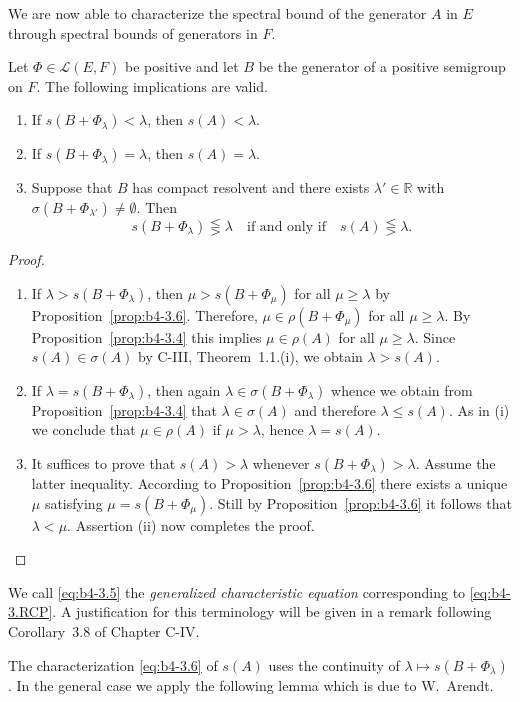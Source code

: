 We are now able to characterize the spectral bound of the generator $A$ in $E$ through spectral bounds of generators in $F$.
\begin{theorem}\label{thm:b4-3.7}
	Let $\Phi \in \mathcal{L}(E,F)$ be positive and let $B$ be the generator of a positive semigroup on $F$. 
	The following implications are valid.
	\begin{enumerate}[\upshape (i)]
		\item If $s(B + \Phi_{\lambda}) < \lambda$, then $s(A) < \lambda$.
        
		\item If $s(B + \Phi_{\lambda}) = \lambda$, then $s(A) = \lambda$.
        
		\item Suppose that $B$ has compact resolvent and there exists $\lambda' \in \mathbb{R}$ with $\sigma(B + \Phi_{\lambda'}) \neq \emptyset$. 
		Then
		\begin{equation}\label{eq:b4-3.6}
		s(B + \Phi_{\lambda}) \lesseqgtr \lambda \quad \text{if and only if} \quad s(A) \lesseqgtr \lambda.
		\end{equation}
	\end{enumerate}
\end{theorem}
\begin{proof}
	\begin{enumerate}[\upshape (i), wide, labelindent=.5em]
	\item 
	If $\lambda > s(B + \Phi_{\lambda})$, then $\mu > s(B + \Phi_{\mu})$ for all $\mu \geq \lambda$ by Proposition~\ref{prop:b4-3.6}.  
	Therefore, $\mu \in \rho(B + \Phi_{\mu})$ for all $\mu \geq \lambda$. 
	By Proposition~\ref{prop:b4-3.4} this implies $\mu \in \rho(A)$ for all $\mu \geq \lambda$. 
	Since $s(A) \in \sigma(A)$ by C-III, Theorem~1.1.(i), we obtain $\lambda > s(A)$.
	
    \item 
	If $\lambda = s(B + \Phi_{\lambda})$, then again $\lambda \in \sigma(B + \Phi_{\lambda})$ whence we obtain from Proposition~\ref{prop:b4-3.4} that $\lambda \in \sigma(A)$ and therefore $\lambda \leq s(A)$. 
	As in (i) we conclude that $\mu \in \rho(A)$ if $\mu > \lambda$, hence $\lambda = s(A)$.
	
	\item 
	It suffices to prove that $s(A) > \lambda$ whenever $s(B + \Phi_{\lambda}) > \lambda$. 
	Assume the latter inequality. 
	According to Proposition~\ref{prop:b4-3.6} there exists a unique $\mu$ satisfying $\mu = s(B + \Phi_{\mu})$. 
	Still by Proposition~\ref{prop:b4-3.6} it follows that $\lambda < \mu$. 
	Assertion (ii) now completes the proof.
	\end{enumerate}
\end{proof}
\begin{remark*}
	We call \eqref{eq:b4-3.5} the \emph{generalized characteristic equation} corresponding to \eqref{eq:b4-3.RCP}. 
	A justification for this terminology will be given in a remark following Corollary~3.8 of Chapter C-IV.
\end{remark*}
The characterization \eqref{eq:b4-3.6} of $s(A)$ uses the continuity of $\lambda \mapsto s(B + \Phi_{\lambda})$. 
In the general case we apply the following lemma which is due to W.~Arendt.


